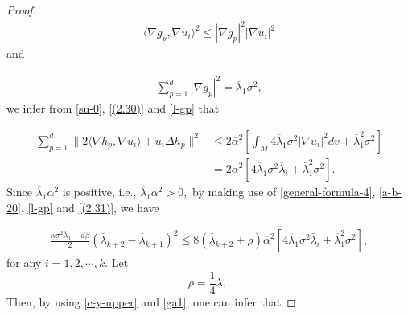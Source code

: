 \documentclass[12pt]{article}
\numberwithin{equation}{section}
\begin{document}
\begin{proof}
 \begin{equation*}\begin{aligned}\langle\nabla g_{p},\nabla u_{i}\rangle^{2}\leq|\nabla g_{p}|^{2}|\nabla u_{i}|^{2}
\end{aligned}\end{equation*}  and

\begin{equation}\begin{aligned}\label{l-gp}\sum^{d}_{p=1}
|\nabla g_{p}|^{2} =\overline{\lambda}_{1}\sigma^{2},
\end{aligned}\end{equation}
we infer
from \eqref{su-0}, \eqref{(2.30)} and \eqref{l-gp} that

\begin{equation}\begin{aligned}\label{(2.31)}\sum_{p=1}^{d}\|2\langle\nabla h_{p},\nabla u_{i}\rangle+u_{i}\Delta h_{p}\|^{2}&\leq2\overline{\alpha}^{2}\left[\int_{M}
4\overline{\lambda}_{1}\sigma^{2}|\nabla u_{i} |^{2}dv+\overline{\lambda}^{2}_{1}
\sigma^{2}\right]
\\&= 2\overline{\alpha}^{2}\left[4\overline{\lambda}_{1}\sigma^{2}\overline{\lambda}_{i} +\overline{\lambda}^{2}_{1}
\sigma^{2}\right].
\end{aligned}\end{equation}
Since $\overline{\lambda}_{1}\alpha^{2}$ is positive, i.e., $\overline{\lambda}_{1}\alpha^{2} > 0,$ by making use of \eqref{general-formula-4}, \eqref{a-b-20}, \eqref{l-gp} and \eqref{(2.31)}, we have

\begin{equation}\begin{aligned}\label{ga1}\frac{\alpha\sigma^{2}\overline{\lambda}_{1}+d\beta}{2}\left(\overline{\lambda}_{k+2}-\overline{\lambda}_{k+1}\right)^{2}
\leq8(\overline{\lambda}_{k+2}+\rho)\overline{\alpha}^{2}\left[4\overline{\lambda}_{1}\sigma^{2}\overline{\lambda}_{i} +\overline{\lambda}^{2}_{1}
\sigma^{2}\right],
\end{aligned}\end{equation}for any $i=1,2,\cdots, k.$ Let $$\rho=\frac{1}{4}\overline{\lambda}_{1}.$$ Then, by using \eqref{c-y-upper} and \eqref{ga1}, one can infer that


\end{proof}
\end{document}
